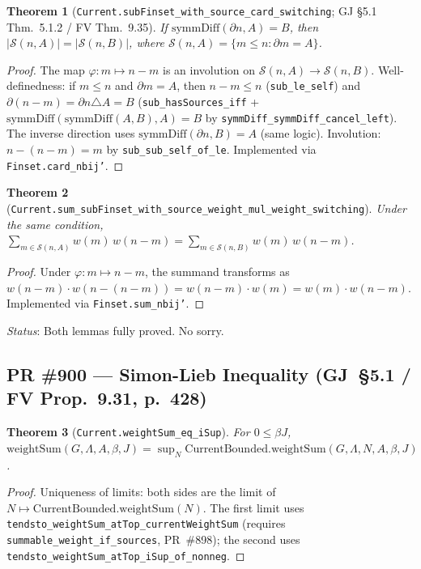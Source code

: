 \documentclass[a4paper,11pt]{article}
\newtheorem{theorem}{Theorem}
\begin{document}
\begin{theorem}[\texttt{Current.subFinset\_with\_source\_card\_switching}; GJ \S5.1 Thm.~5.1.2 / FV Thm.~9.35]
  If $\text{symmDiff}(\partial n, A) = B$, then $|\mathcal{S}(n,A)| = |\mathcal{S}(n,B)|$,
  where $\mathcal{S}(n,A) = \{m \leq n : \partial m = A\}$.
\end{theorem}
\begin{proof}
The map $\varphi: m \mapsto n - m$ is an involution on $\mathcal{S}(n,A) \to \mathcal{S}(n,B)$.
Well-definedness: if $m \leq n$ and $\partial m = A$, then $n-m \leq n$ (\texttt{sub\_le\_self})
and $\partial(n-m) = \partial n \triangle A = B$ (\texttt{sub\_hasSources\_iff} +
$\text{symmDiff}(\text{symmDiff}(A,B), A) = B$ by \texttt{symmDiff\_symmDiff\_cancel\_left}).
The inverse direction uses $\text{symmDiff}(\partial n, B) = A$ (same logic).
Involution: $n-(n-m)=m$ by \texttt{sub\_sub\_self\_of\_le}.
Implemented via \texttt{Finset.card\_nbij'}.
\end{proof}

\begin{theorem}[\texttt{Current.sum\_subFinset\_with\_source\_weight\_mul\_weight\_switching}]
  Under the same condition, $\sum_{m \in \mathcal{S}(n,A)} w(m)\,w(n-m) = \sum_{m \in \mathcal{S}(n,B)} w(m)\,w(n-m)$.
\end{theorem}
\begin{proof}
Under $\varphi: m \mapsto n-m$, the summand transforms as
$w(n-m)\cdot w(n-(n-m)) = w(n-m)\cdot w(m) = w(m)\cdot w(n-m)$.
Implemented via \texttt{Finset.sum\_nbij'}.
\end{proof}
\noindent\textit{Status}: Both lemmas fully proved. No sorry.

\subsection*{PR \#900 --- Simon-Lieb Inequality (GJ~\S5.1 / FV Prop.~9.31, p.~428)}

\begin{theorem}[\texttt{Current.weightSum\_eq\_iSup}]
  For $0 \le \beta J$,
  $\mathrm{weightSum}(G,\Lambda,A,\beta,J) = \sup_N \mathrm{CurrentBounded.weightSum}(G,\Lambda,N,A,\beta,J)$.
\end{theorem}
\begin{proof}
  Uniqueness of limits: both sides are the limit of $N\mapsto\mathrm{CurrentBounded.weightSum}(N)$.
  The first limit uses \texttt{tendsto\_weightSum\_atTop\_currentWeightSum} (requires \texttt{summable\_weight\_if\_sources}, PR~\#898); the second uses \texttt{tendsto\_weightSum\_atTop\_iSup\_of\_nonneg}.
\end{proof}
\end{document}
